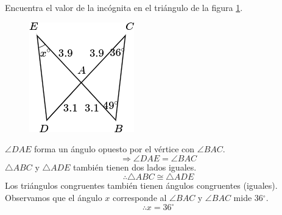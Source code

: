 Encuentra el valor de la incógnita en el triángulo de la figura \ref{fig:angle_triangle_15}.

\begin{minipage}[t][5.5cm][b]{0.3\textwidth}
    \begin{figure}[H]
        \centering
        \includegraphics[width=0.8\linewidth]{../images/angle_triangle_15}
        \caption{}
        \label{fig:angle_triangle_15}
    \end{figure}
\end{minipage}\hfill
\begin{minipage}[t]{0.65\textwidth}
    \begin{solutionbox}{5.5cm}
        $\angle DAE$ forma un ángulo opuesto por el vértice con $\angle BAC$.
        \[\Rightarrow \angle DAE = \angle BAC \]
        $\triangle ABC$ y $\triangle ADE$ también tienen dos lados iguales.
        \[\therefore \triangle ABC \cong \triangle ADE\]
        Los triángulos congruentes también tienen ángulos congruentes (iguales).
        Observamos que el ángulo $x$ corresponde al
        $\angle BAC$ y $\angle BAC$ mide
        36$^\circ$.
        \[\therefore x=36^\circ\]
    \end{solutionbox}
\end{minipage}
